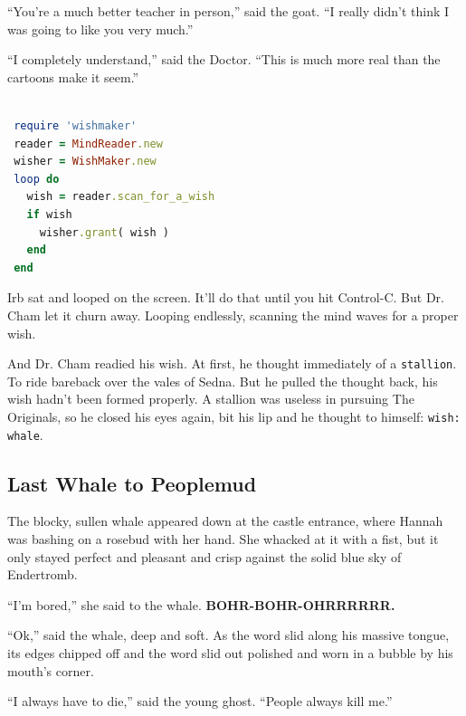 \documentclass[10pt,twoside]{report}
\begin{document}
``You're a much better teacher in person,'' said the goat.  ``I really
didn't think I was going to like you very much.''

``I completely understand,'' said the Doctor.  ``This is much more
real than the cartoons make it seem.''


\begin{lstlisting}[basicstyle=\ttfamily\color{basiccolor},
    commentstyle = \ttfamily\color{commentcolor},
    keywordstyle=\ttfamily\color{keywordscolor},
    stringstyle=\color{stringcolor},
    language=Ruby,
    basicstyle=\small\ttfamily,
    showstringspaces=false,
  ]

 require 'wishmaker'
 reader = MindReader.new
 wisher = WishMaker.new
 loop do
   wish = reader.scan_for_a_wish
   if wish
     wisher.grant( wish )
   end
 end

\end{lstlisting}



Irb sat and looped on the screen.  It'll do that until you hit
Control-C.  But Dr. Cham let it churn away.  Looping endlessly,
scanning the mind waves for a proper wish.

And Dr. Cham readied his wish.  At first, he thought immediately of a
\lstinline[breaklines=true]|stallion|.  To ride bareback over the
vales of Sedna.  But he pulled the thought back, his wish hadn't been
formed properly. A stallion was useless in pursuing The Originals, so
he closed his eyes again, bit his lip and he thought to himself:
\lstinline[breaklines=true]|wish: whale|.



\subsection{Last Whale to Peoplemud}



The blocky, sullen whale appeared down at the castle entrance, where
Hannah was bashing on a rosebud with her hand.  She whacked at it with
a fist, but it only stayed perfect and pleasant and crisp against the
solid blue sky of Endertromb.

``I'm bored,'' she said to the whale.  {\bf BOHR-BOHR-OHRRRRRR.}

``Ok,'' said the whale, deep and soft.  As the word slid along his
massive tongue, its edges chipped off and the word slid out polished
and worn in a bubble by his mouth's corner.

``I always have to die,'' said the young ghost.  ``People always kill
me.''
\end{document}

